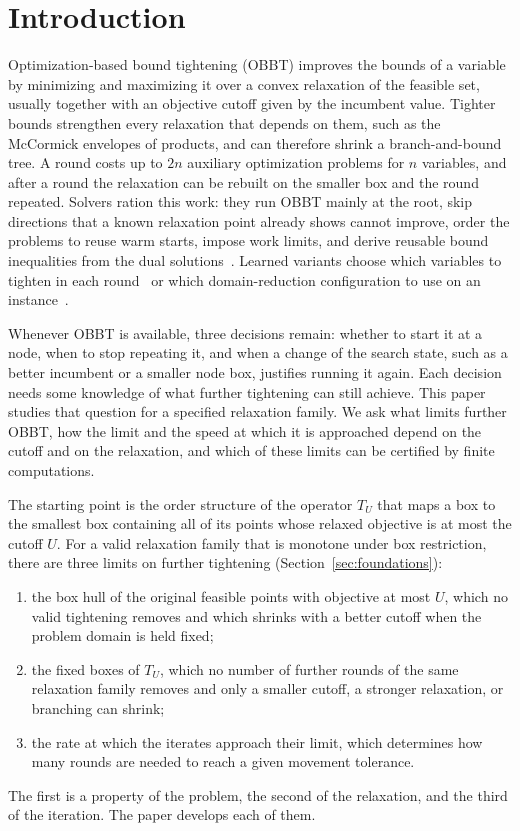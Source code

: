 \section{Introduction}\label{sec:introduction}

Optimization-based bound tightening (OBBT) improves the bounds of a variable
by minimizing and maximizing it over a convex relaxation of the feasible
set, usually together with an objective cutoff given by the incumbent value.
Tighter bounds strengthen every relaxation that depends on them, such as the
McCormick envelopes of products, and can therefore shrink a branch-and-bound
tree. A round costs up to $2n$ auxiliary optimization problems for $n$
variables, and after a round the relaxation can be rebuilt on the smaller box
and the round repeated. Solvers ration this work: they run OBBT mainly at the
root, skip directions that a known relaxation point already shows cannot
improve, order the problems to reuse warm starts, impose work limits, and
derive reusable bound inequalities from the dual
solutions~\cite{gleixner2017-three-enhancements-for-optimization-based,scip2026obbt}.
Learned variants choose which variables to tighten in each
round~\cite{cengil2025learning} or which domain-reduction configuration to
use on an instance~\cite{gomezcasares2025domain}.

Whenever OBBT is available, three decisions remain: whether to start it at a
node, when to stop repeating it, and when a change of the search state, such
as a better incumbent or a smaller node box, justifies running it again. Each
decision needs some knowledge of what further tightening can still achieve.
This paper studies that question for a specified relaxation family. We ask
what limits further OBBT, how the limit and the speed at which it is
approached depend on the cutoff and on the relaxation, and which of these
limits can be certified by finite computations.

The starting point is the order structure of the operator $T_U$ that maps a
box to the smallest box containing all of its points whose relaxed objective
is at most the cutoff $U$. For a valid relaxation family that is monotone
under box restriction, there are three limits on further tightening
(Section~\ref{sec:foundations}):
\begin{enumerate}[label=(\roman*)]
\item the box hull of the original feasible points with objective at most
  $U$, which no valid tightening removes and which shrinks with a better
  cutoff when the problem domain is held fixed;
\item the fixed boxes of $T_U$, which no number of further rounds of the same
  relaxation family removes and only a smaller cutoff, a stronger
  relaxation, or branching can shrink;
\item the rate at which the iterates approach their limit, which determines
  how many rounds are needed to reach a given movement tolerance.
\end{enumerate}
The first is a property of the problem, the second of the relaxation, and the
third of the iteration. The paper develops each of them.

